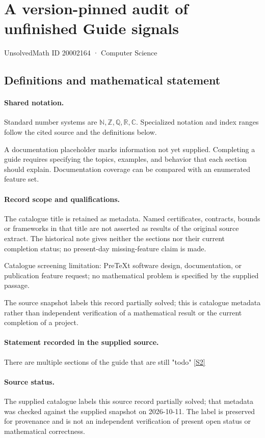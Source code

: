\documentclass[11pt]{article}
\newcommand{\sref}[2]{\hyperlink{source:#1:#2}{[S#2]}}
\begin{document}
\setcounter{section}{20002163}
\section{A version-pinned audit of unfinished Guide signals}\label{20002164}
{\small\sffamily UnsolvedMath ID 20002164 · Computer Science}
\subsection{Definitions and mathematical statement}

\paragraph{Shared notation.}Standard number systems are $\mathbb N,\mathbb Z,\mathbb Q,\mathbb R,\mathbb C$. Specialized notation and index ranges follow the cited source and the definitions below.


A documentation placeholder marks information not yet supplied. Completing a guide requires specifying the topics, examples, and behavior that each section should explain. Documentation coverage can be compared with an enumerated feature set.
\paragraph{Record scope and qualifications.}
The catalogue title is retained as metadata. Named certificates, contracts, bounds or frameworks in that title are not asserted as results of the original source extract.
The historical note gives neither the sections nor their current completion status; no present-day missing-feature claim is made.

Catalogue screening limitation: PreTeXt software design, documentation, or publication feature request; no mathematical problem is specified by the supplied passage.

The source snapshot labels this record partially solved; this is catalogue metadata rather than independent verification of a mathematical result or the current completion of a project.
\paragraph{Statement recorded in the supplied source.}
There are multiple sections of the guide that are still "todo" \sref{20002164}{2}
\paragraph{Source status.}
The supplied catalogue labels this source record partially solved; that metadata was checked against the supplied snapshot on 2026-10-11. The label is preserved for provenance and is not an independent verification of present open status or mathematical correctness.
\end{document}
